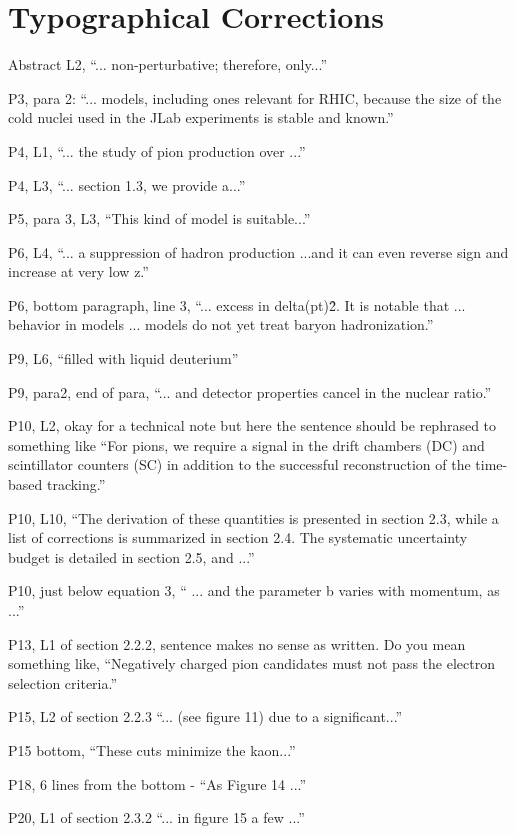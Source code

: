 \documentclass[12pt]{article}
\begin{document}
\section{Typographical Corrections}

Abstract L2, “... non-perturbative; therefore, only...”

P3, para 2:  “... models, including ones relevant for RHIC, because the size of the cold nuclei 
used in the JLab experiments is stable and known.”

P4, L1, “... the study of pion production over ...”

P4, L3, “... section 1.3, we provide a...”

P5, para 3, L3, “This kind of model is suitable...”

P6, L4, “... a suppression of hadron production ...and it can even reverse sign and increase at 
very low z.”

P6, bottom paragraph, line 3, “... excess in delta(pt)\^2.  It is notable that ... behavior in models 
... models do not yet treat baryon hadronization.”

P9, L6, “filled with liquid deuterium”

P9, para2, end of para, “... and detector properties cancel in the nuclear ratio.”

P10, L2, okay for a technical note but here the sentence should be rephrased to something like 
“For pions, we require a signal in the drift chambers (DC) and scintillator counters (SC) in 
addition to the successful reconstruction of the time-based tracking.”

P10, L10, “The derivation of these quantities is presented in section 2.3, while a list of 
corrections  is summarized in section 2.4.  The systematic uncertainty budget is detailed in 
section 2.5, and ...”

P10, just below equation 3, “ ... and the parameter b varies with momentum, as ...”

P13, L1 of section 2.2.2, sentence makes no sense as written. Do you mean something like, 
“Negatively charged pion candidates must not pass the electron selection criteria.”

P15, L2 of section 2.2.3 “... (see figure 11) due to a significant...”

P15 bottom, “These cuts minimize the kaon...”

P18, 6 lines from the bottom - “As Figure 14 ...”

P20, L1 of section 2.3.2 “... in figure 15 a few ...”
\end{document}

